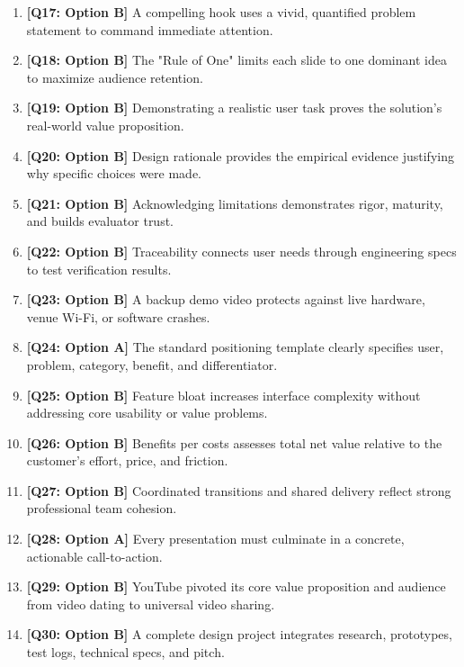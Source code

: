 \begin{expbox}
\begin{enumerate}[leftmargin=6mm, itemsep=2.5mm]
  \item \textbf{[Q17: Option B]} A compelling hook uses a vivid, quantified problem statement to command immediate attention.
  \item \textbf{[Q18: Option B]} The "Rule of One" limits each slide to one dominant idea to maximize audience retention.
  \item \textbf{[Q19: Option B]} Demonstrating a realistic user task proves the solution's real-world value proposition.
  \item \textbf{[Q20: Option B]} Design rationale provides the empirical evidence justifying why specific choices were made.
  \item \textbf{[Q21: Option B]} Acknowledging limitations demonstrates rigor, maturity, and builds evaluator trust.
  \item \textbf{[Q22: Option B]} Traceability connects user needs through engineering specs to test verification results.
  \item \textbf{[Q23: Option B]} A backup demo video protects against live hardware, venue Wi-Fi, or software crashes.
  \item \textbf{[Q24: Option A]} The standard positioning template clearly specifies user, problem, category, benefit, and differentiator.
  \item \textbf{[Q25: Option B]} Feature bloat increases interface complexity without addressing core usability or value problems.
  \item \textbf{[Q26: Option B]} Benefits per costs assesses total net value relative to the customer's effort, price, and friction.
  \item \textbf{[Q27: Option B]} Coordinated transitions and shared delivery reflect strong professional team cohesion.
  \item \textbf{[Q28: Option A]} Every presentation must culminate in a concrete, actionable call-to-action.
  \item \textbf{[Q29: Option B]} YouTube pivoted its core value proposition and audience from video dating to universal video sharing.
  \item \textbf{[Q30: Option B]} A complete design project integrates research, prototypes, test logs, technical specs, and pitch.
\end{enumerate}
\end{expbox}
